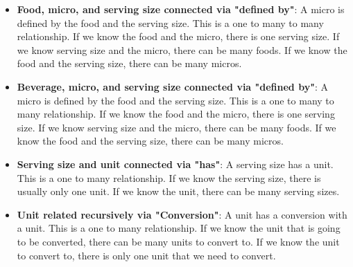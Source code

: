 \documentclass{report}
\begin{document}
\begin{itemize}
        \item \textbf{Food, micro, and serving size connected via "defined by"}: A micro is defined by the food and the serving size. This is a one to many to many relationship. If we know the food and the micro, there is one serving size. If we know serving size and the micro, there can be many foods. If we know the food and the serving size, there can be many micros.
        \item \textbf{Beverage, micro, and serving size connected via "defined by"}: A micro is defined by the food and the serving size. This is a one to many to many relationship. If we know the food and the micro, there is one serving size. If we know serving size and the micro, there can be many foods. If we know the food and the serving size, there can be many micros.
        \item \textbf{Serving size and unit connected via "has"}: A serving size has a unit. This is a one to many relationship. If we know the serving size, there is usually only one unit. If we know the unit, there can be many serving sizes.
        \item \textbf{Unit related recursively via "Conversion"}: A unit has a conversion with a unit. This is a one to many relationship. If we know the unit that is going to be converted, there can be many units to convert to. If we know the unit to convert to, there is only one unit that we need to convert.
    \end{itemize}


    \pagebreak \bigbreak \noindent 
\end{document}
